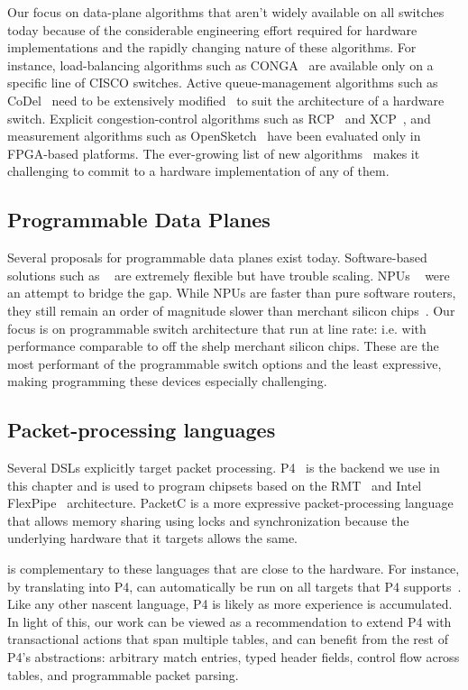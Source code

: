   Our focus on data-plane algorithms that aren't widely available on all
switches today because of the considerable engineering effort required for
hardware implementations and the rapidly changing nature of these algorithms.
For instance, load-balancing algorithms such as CONGA~\cite{conga} are
available only on a specific line of CISCO switches.  Active queue-management
algorithms such as CoDel~\cite{codel} need to be extensively
modified~\cite{pie} to suit the architecture of a hardware switch.  Explicit
congestion-control algorithms such as RCP~\cite{rcp} and XCP~\cite{xcp}, and
measurement algorithms such as OpenSketch~\cite{opensketch} have been evaluated
only in FPGA-based platforms.  The ever-growing list of new
algorithms~\cite{pdq, d3, detail} makes it challenging to commit to a hardware
implementation of any of them.

\subsection{Programmable Data Planes}
Several proposals for programmable data planes exist today. Software-based
solutions such as ~\cite{click, fastpass, flexplane} are extremely flexible but
have trouble scaling. NPUs ~\cite{intel} were an attempt to bridge the gap.
While NPUs are faster than pure software routers, they still remain an order of
magnitude slower than merchant silicon chips~\cite{rmt}. Our focus is on
programmable switch architecture that run at line rate: i.e. with performance
comparable to off the shelp merchant silicon chips. These are the most
performant of the programmable switch options and the least expressive, making
programming these devices especially challenging.

\subsection{Packet-processing languages}
Several DSLs explicitly target packet processing. P4~\cite{p4} is the backend
we use in this chapter and is used to program chipsets based on the
RMT~\cite{rmt} and Intel FlexPipe~\cite{flexpipe} architecture. PacketC is a
more expressive packet-processing language that allows memory sharing using
locks and synchronization because the underlying hardware that it targets
allows the same.

\pktlanguage{} is complementary to these languages that are close to the
hardware. For instance, by translating into P4, \pktlanguage{} can automatically be
run on all targets that P4 supports~\cite{lavanya_compiler}. Like any other
nascent language, P4 is likely as more experience is accumulated. In light of
this, our work can be viewed as a recommendation to extend P4 with
transactional actions that span multiple tables, and can benefit from the rest
of P4's abstractions: arbitrary match entries, typed header fields, control
flow across tables, and programmable packet parsing.

